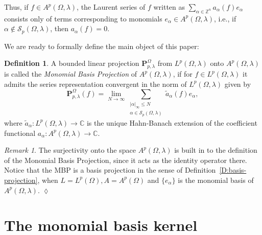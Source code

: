 \documentclass[letterpaper,11pt,reqno]{amsart}
\theoremstyle{plain}
\theoremstyle{definition}
\newtheorem{definition}[equation]{Definition}
\theoremstyle{remark}
\theoremstyle{remark}
\newtheorem{remark}[equation]{Remark}
\numberwithin{equation}{section}
\newcommand{\abs}[1]{\left\vert#1\right\vert}
\newcommand{\wt}{\widetilde}
\newcommand{\cs}{{\mathcal S}}
\newcommand{\C}{{\mathbb C}}
\newcommand{\T}{{\mathbb T}}
\newcommand{\Z}{{\mathbb Z}}
\begin{document}
Thus, if $f\in A^p(\Omega,\lambda)$, the Laurent series of $f$ written as $\sum_{\alpha\in \Z^n} a_\alpha(f) e_\alpha$ consists only of terms corresponding to monomials $e_\alpha \in A^p(\Omega,\lambda)$, i.e., if $\alpha \not \in \mathcal{S}_p(\Omega,\lambda) $, then $a_\alpha(f) = 0$.





We are ready to formally define the main object of this paper:
\begin{definition}\label{D:def-of-MBP-1}
A bounded linear projection $\bm{P}_{p,\lambda}^\Omega$ from $L^p(\Omega,\lambda)$ onto $A^p(\Omega,\lambda)$ is called the \emph{Monomial Basis Projection} of $A^p(\Omega,\lambda)$, if for $f \in L^p(\Omega,\lambda)$ it admits the series representation convergent in the norm of $L^p(\Omega,\lambda)$ given by
\begin{equation}\label{E:def-of-MBP-2}
\bm{P}^\Omega_{p,\lambda}(f) = \lim_{N\to \infty} \sum_{\substack{\abs{\alpha}_\infty\leq N \\ \alpha\in \cs_p(\Omega,\lambda) }}\wt{a}_\alpha(f) e_\alpha,
\end{equation}
where $\wt{a}_\alpha:L^p(\Omega,\lambda) \to \C$ is the unique Hahn-Banach extension of the coefficient functional $a_\alpha:A^p(\Omega,\lambda) \to \C$.
\end{definition}

\begin{remark}\label{R:surjectivity}
The surjectivity onto the space $A^p(\Omega,\lambda)$ is built in to the definition of the Monomial Basis Projection, since it acts as the identity operator there.
Notice that the MBP is a basis projection in the sense of Definition~\ref{D:basis-projection}, when $L=L^p(\Omega), A=A^p(\Omega)$ and $\{e_\alpha\}$ is the  monomial basis of $A^p(\Omega,\lambda)$.
\hfill $\lozenge$
\end{remark}

\section{The monomial basis kernel}\label{sec-MBK}
\end{document}
